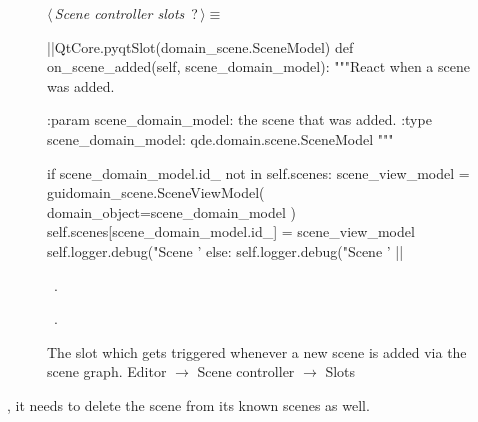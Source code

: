 \documentclass[%
    a4paper,    %
    justified,  %
    nobib,      %
    openany     %
]{tufte-book}
\begin{document}
\begin{figure}
\begin{flushleft} \small
\begin{minipage}{\linewidth}\label{scrap93}\raggedright\small
{} $\langle\,${\itshape Scene controller slots}\nobreak\ {\footnotesize {?}}$\,\rangle\equiv$
\vspace{-1ex}
\begin{pythoncode}
|\normalfont{}\fontfamily{}|QtCore.pyqtSlot(domain_scene.SceneModel)
def on_scene_added(self, scene_domain_model):
    """React when a scene was added.

    :param scene_domain_model: the scene that was added.
    :type scene_domain_model:  qde.domain.scene.SceneModel
    """

    if scene_domain_model.id_ not in self.scenes:
        scene_view_model = guidomain_scene.SceneViewModel(
            domain_object=scene_domain_model
        )
        self.scenes[scene_domain_model.id_] = scene_view_model
        self.logger.debug("Scene '%
    else:
        self.logger.debug("Scene '%
|\NWsep|
\end{pythoncode}
\vspace{1.5ex}
\footnotesize
\begin{list}{}{\setlength{\itemsep}{-\parsep}\setlength{\itemindent}{-\leftmargin}}
\item \NWtxtMacroDefBy\ .
\item \NWtxtMacroRefIn\ .

\item{}
\end{list}
\end{minipage}\vspace{4ex}
\end{flushleft}
\caption{The slot which gets triggered whenever a new scene is added via the
  scene graph.
  \newline{}\newline{}Editor $\rightarrow$ Scene controller $\rightarrow$
  Slots}
\label{editor:lst:scene-controller:slots:on-scene-added}
\end{figure}

, it needs to delete the scene from its
known scenes as well.
\end{document}
